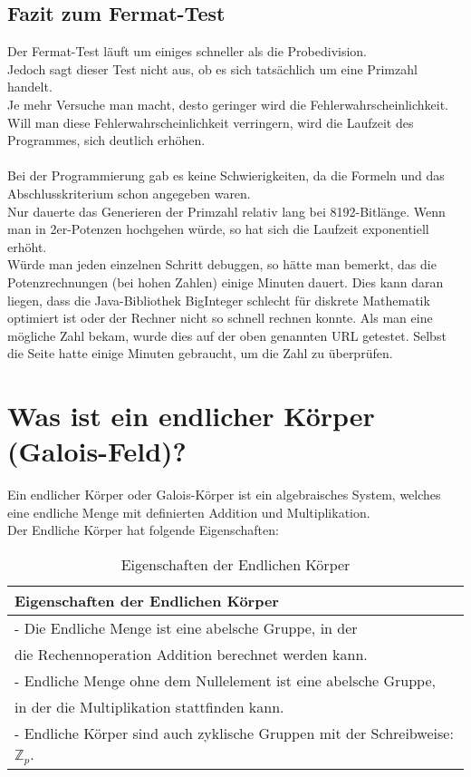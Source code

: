 \subsection*{Fazit zum Fermat-Test}

Der Fermat-Test läuft um einiges schneller als die Probedivision.\\
Jedoch sagt dieser Test nicht aus, ob es sich tatsächlich um eine Primzahl handelt.\\
Je mehr Versuche man macht, desto geringer wird die Fehlerwahrscheinlichkeit. \\
Will man diese Fehlerwahrscheinlichkeit verringern, wird die Laufzeit des Programmes, sich deutlich erhöhen.  \\
\\
Bei der Programmierung gab es keine Schwierigkeiten, da die Formeln und das Abschlusskriterium schon angegeben waren.\\
Nur dauerte das Generieren der Primzahl relativ lang bei 8192-Bitlänge. Wenn man in 2er-Potenzen hochgehen würde, so hat sich die Laufzeit exponentiell erhöht.\\
Würde man jeden einzelnen Schritt debuggen, so hätte man bemerkt, das die Potenzrechnungen (bei hohen Zahlen) einige Minuten dauert.
Dies kann daran liegen, dass die Java-Bibliothek BigInteger schlecht für diskrete Mathematik optimiert ist oder der Rechner nicht so schnell rechnen konnte.
Als man eine mögliche Zahl bekam, wurde dies auf der oben genannten URL getestet. Selbst die Seite hatte einige Minuten gebraucht, um die Zahl zu überprüfen.\\ 
\newpage
\section{Was ist ein endlicher Körper (Galois-Feld)?}

Ein endlicher Körper oder Galois-Körper ist ein algebraisches System, welches eine endliche Menge mit definierten Addition und Multiplikation.\\
Der Endliche Körper hat folgende Eigenschaften:


\begin{table}[!ht]
    \centering
        \begin{tabular}{l}
            \toprule
            \textbf{Eigenschaften der Endlichen Körper}\\
            \midrule
            - Die Endliche Menge ist eine abelsche Gruppe, in der \\
            die Rechennoperation Addition berechnet werden kann.\\
            - Endliche Menge ohne dem Nullelement ist eine abelsche Gruppe, \\
            in der die Multiplikation stattfinden kann.\\
            - Endliche Körper sind auch zyklische Gruppen mit der Schreibweise: $ \mathbb{Z}_p $. \\
           \bottomrule
        \end{tabular}
        \caption{Eigenschaften der Endlichen Körper \cite{sec1}}
        \label{tab3}
    \end{table}

